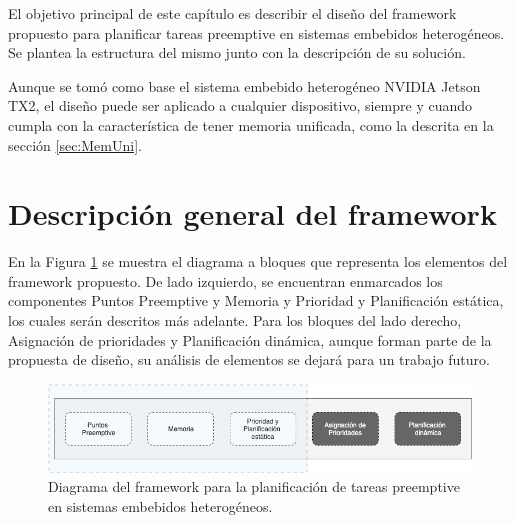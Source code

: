 El objetivo principal de este capítulo es describir el diseño del framework propuesto para planificar tareas preemptive en sistemas embebidos heterogéneos. Se plantea la estructura del mismo junto con la descripción de su solución. 

Aunque se tomó como base el sistema embebido heterogéneo NVIDIA Jetson TX2, el diseño puede ser aplicado a cualquier dispositivo, siempre y cuando cumpla con la característica de tener memoria unificada, como la descrita en la sección \ref{sec:MemUni}.

\section{Descripción general del framework}

En la Figura \ref{fig:diagramabase} se muestra el diagrama a bloques que representa los elementos del framework propuesto. De lado izquierdo, se encuentran enmarcados los componentes Puntos Preemptive y Memoria y Prioridad y Planificación estática, los cuales serán descritos más adelante. Para los bloques del lado derecho, Asignación de prioridades y Planificación dinámica, aunque forman parte de la propuesta de diseño, su análisis de elementos se dejará para un trabajo futuro.

  \begin{figure}[ht]
      \centering
        \includegraphics[scale=.65]{img/diagrama_framework}
        \caption{Diagrama del framework para la planificación de tareas preemptive en sistemas embebidos heterogéneos.}
        \label{fig:diagramabase}
    \end{figure}
  
